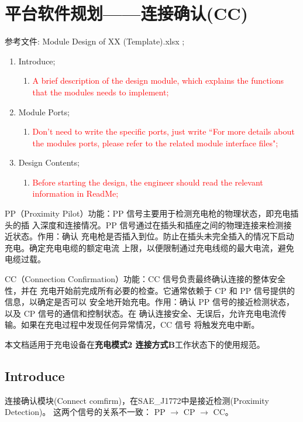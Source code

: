 
\chapter{平台软件规划——连接确认(CC)}

 参考文件: Module Design of XX (Template).xlsx \cite{MDOT1};   
  
 \begin{enumerate}[label=\textbullet]
	\item  Introduce;
        \begin{enumerate}[label={}]
            \item \textcolor{red}{A brief description of the design module, which explains the functions that the modules needs to implement;}
        \end{enumerate}
	\item  Module Ports;
        \begin{enumerate}[label={}]
            \item \textcolor{red}{Don't need to write the specific ports, just write ``For more details about the modules ports, please refer to the related module interface files";}
        \end{enumerate}
	\item  Design Contents;
        \begin{enumerate}[label={}]
            \item \textcolor{red}{Before starting the design, the engineer should read the relevant information in ReadMe;}
        \end{enumerate}
\end{enumerate}

PP（Proximity Pilot）功能：PP 信号主要用于检测充电枪的物理状态，即充电插头的插
入深度和连接情况。PP 信号通过在插头和插座之间的物理连接来检测接近状态。作用：确认
充电枪是否插入到位。防止在插头未完全插入的情况下启动充电。确定充电电缆的额定电流
上限，以便限制通过充电线缆的最大电流，避免电缆过载。

CC（Connection Confirmation）功能：CC 信号负责最终确认连接的整体安全性，并在
充电开始前完成所有必要的检查。它通常依赖于 CP 和 PP 信号提供的信息，以确定是否可以
安全地开始充电。作用：确认 PP 信号的接近检测状态，以及 CP 信号的通信和控制状态。在
确认连接安全、无误后，允许充电电流传输。如果在充电过程中发现任何异常情况，CC 信号
将触发充电中断。

本文档适用于充电设备在{\bf 充电模式2 连接方式B}工作状态下的使用规范。

\section{Introduce}
 连接确认模块(Connect comfirm)，在SAE\_J1772中是接近检测(Proximity Detection)\cite{SAE}。 
 这两个信号的关系不一致： PP $\longrightarrow$ CP $\longrightarrow$ CC。

